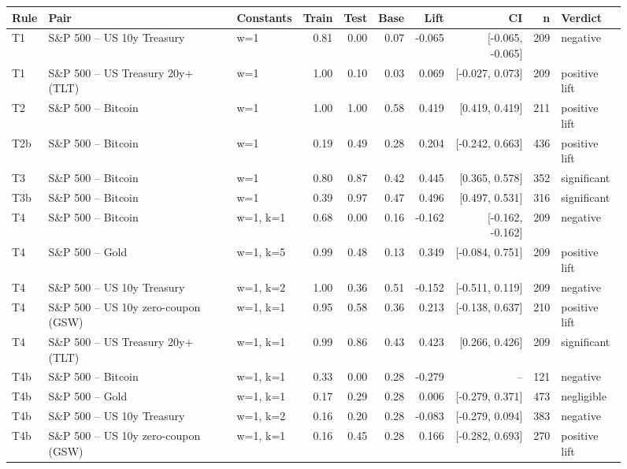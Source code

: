 \begin{figure}
\centering
\begin{tabular}{lllrrrrrrl}
\toprule
Rule & Pair & Constants & Train & Test & Base & Lift & CI & n & Verdict \\
\midrule
T1 & S\&P 500 -- US 10y Treasury & w=1 & 0.81 & 0.00 & 0.07 & -0.065 & [-0.065, -0.065] & 209 & negative \\
T1 & S\&P 500 -- US Treasury 20y+ (TLT) & w=1 & 1.00 & 0.10 & 0.03 & 0.069 & [-0.027, 0.073] & 209 & positive lift \\
T2 & S\&P 500 -- Bitcoin & w=1 & 1.00 & 1.00 & 0.58 & 0.419 & [0.419, 0.419] & 211 & positive lift \\
T2b & S\&P 500 -- Bitcoin & w=1 & 0.19 & 0.49 & 0.28 & 0.204 & [-0.242, 0.663] & 436 & positive lift \\
T3 & S\&P 500 -- Bitcoin & w=1 & 0.80 & 0.87 & 0.42 & 0.445 & [0.365, 0.578] & 352 & significant \\
T3b & S\&P 500 -- Bitcoin & w=1 & 0.39 & 0.97 & 0.47 & 0.496 & [0.497, 0.531] & 316 & significant \\
T4 & S\&P 500 -- Bitcoin & w=1, k=1 & 0.68 & 0.00 & 0.16 & -0.162 & [-0.162, -0.162] & 209 & negative \\
T4 & S\&P 500 -- Gold & w=1, k=5 & 0.99 & 0.48 & 0.13 & 0.349 & [-0.084, 0.751] & 209 & positive lift \\
T4 & S\&P 500 -- US 10y Treasury & w=1, k=2 & 1.00 & 0.36 & 0.51 & -0.152 & [-0.511, 0.119] & 209 & negative \\
T4 & S\&P 500 -- US 10y zero-coupon (GSW) & w=1, k=1 & 0.95 & 0.58 & 0.36 & 0.213 & [-0.138, 0.637] & 210 & positive lift \\
T4 & S\&P 500 -- US Treasury 20y+ (TLT) & w=1, k=1 & 0.99 & 0.86 & 0.43 & 0.423 & [0.266, 0.426] & 209 & significant \\
T4b & S\&P 500 -- Bitcoin & w=1, k=1 & 0.33 & 0.00 & 0.28 & -0.279 & -- & 121 & negative \\
T4b & S\&P 500 -- Gold & w=1, k=1 & 0.17 & 0.29 & 0.28 & 0.006 & [-0.279, 0.371] & 473 & negligible \\
T4b & S\&P 500 -- US 10y Treasury & w=1, k=2 & 0.16 & 0.20 & 0.28 & -0.083 & [-0.279, 0.094] & 383 & negative \\
T4b & S\&P 500 -- US 10y zero-coupon (GSW) & w=1, k=1 & 0.16 & 0.45 & 0.28 & 0.166 & [-0.282, 0.693] & 270 & positive lift \\

\end{tabular}
\end{figure}
